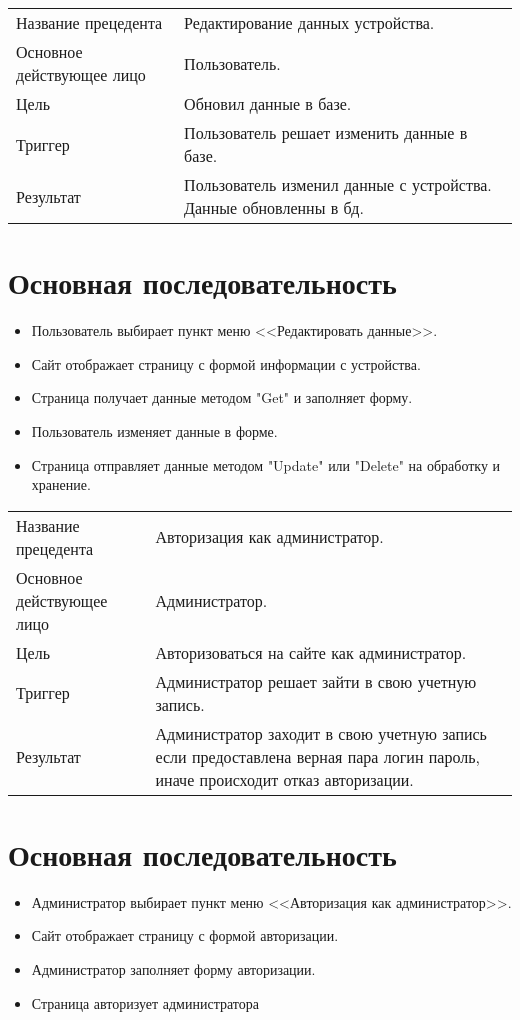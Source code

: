 \begin{table}[]
    \begin{tabular}{ll}
    Название прецедента       & Редактирование данных устройства.\\
    Основное действующее лицо & Пользователь.\\
    Цель                      & Обновил данные в базе.\\
    Триггер                   & Пользователь решает изменить данные в базе.\\
    Результат                 & Пользователь изменил данные с устройства. Данные обновленны в бд.
    \end{tabular}
\end{table}

\section{Основная последовательность}
\begin{itemize}
    \item Пользователь выбирает пункт меню <<Редактировать данные>>.
    \item Сайт отображает страницу с формой информации с устройства.
    \item Страница получает данные методом "Get" и заполняет форму. 
    \item Пользователь изменяет данные в форме.
    \item Страница отправляет данные методом "Update" или "Delete" на обработку и хранение. 
\end{itemize}

\begin{table}[]
    \begin{tabular}{ll}
    Название прецедента       & Авторизация как администратор.\\
    Основное действующее лицо & Администратор.\\
    Цель                      & Авторизоваться на сайте как администратор.\\
    Триггер                   & Администратор решает зайти в свою учетную запись.\\
    Результат                 & Администратор заходит в свою учетную запись если предоставлена верная пара логин пароль, иначе происходит отказ авторизации. 
    \end{tabular}
\end{table}

\section{Основная последовательность}
\begin{itemize}
    \item Администратор выбирает пункт меню <<Авторизация как администратор>>.
    \item Сайт отображает страницу с формой авторизации.
    \item Администратор заполняет форму авторизации.
    \item Страница авторизует администратора
\end{itemize}
